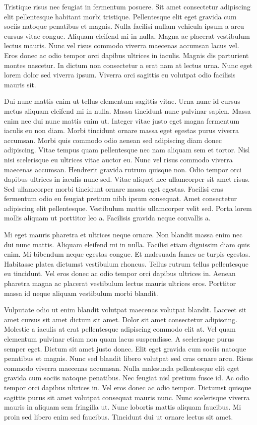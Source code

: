 \documentclass[11pt,a4paper]{article}
\begin{document}
Tristique risus nec feugiat in fermentum posuere. Sit amet consectetur adipiscing elit pellentesque habitant morbi tristique. Pellentesque elit eget gravida cum sociis natoque penatibus et magnis. Nulla facilisi nullam vehicula ipsum a arcu cursus vitae congue. Aliquam eleifend mi in nulla. Magna ac placerat vestibulum lectus mauris. Nunc vel risus commodo viverra maecenas accumsan lacus vel. Eros donec ac odio tempor orci dapibus ultrices in iaculis. Magnis dis parturient montes nascetur. In dictum non consectetur a erat nam at lectus urna. Nunc eget lorem dolor sed viverra ipsum. Viverra orci sagittis eu volutpat odio facilisis mauris sit.

Dui nunc mattis enim ut tellus elementum sagittis vitae. Urna nunc id cursus metus aliquam eleifend mi in nulla. Massa tincidunt nunc pulvinar sapien. Massa enim nec dui nunc mattis enim ut. Integer vitae justo eget magna fermentum iaculis eu non diam. Morbi tincidunt ornare massa eget egestas purus viverra accumsan. Morbi quis commodo odio aenean sed adipiscing diam donec adipiscing. Vitae tempus quam pellentesque nec nam aliquam sem et tortor. Nisl nisi scelerisque eu ultrices vitae auctor eu. Nunc vel risus commodo viverra maecenas accumsan. Hendrerit gravida rutrum quisque non. Odio tempor orci dapibus ultrices in iaculis nunc sed. Vitae aliquet nec ullamcorper sit amet risus. Sed ullamcorper morbi tincidunt ornare massa eget egestas. Facilisi cras fermentum odio eu feugiat pretium nibh ipsum consequat. Amet consectetur adipiscing elit pellentesque. Vestibulum mattis ullamcorper velit sed. Porta lorem mollis aliquam ut porttitor leo a. Facilisis gravida neque convallis a.

Mi eget mauris pharetra et ultrices neque ornare. Non blandit massa enim nec dui nunc mattis. Aliquam eleifend mi in nulla. Facilisi etiam dignissim diam quis enim. Mi bibendum neque egestas congue. Et malesuada fames ac turpis egestas. Habitasse platea dictumst vestibulum rhoncus. Tellus rutrum tellus pellentesque eu tincidunt. Vel eros donec ac odio tempor orci dapibus ultrices in. Aenean pharetra magna ac placerat vestibulum lectus mauris ultrices eros. Porttitor massa id neque aliquam vestibulum morbi blandit.

Vulputate odio ut enim blandit volutpat maecenas volutpat blandit. Laoreet sit amet cursus sit amet dictum sit amet. Dolor sit amet consectetur adipiscing. Molestie a iaculis at erat pellentesque adipiscing commodo elit at. Vel quam elementum pulvinar etiam non quam lacus suspendisse. A scelerisque purus semper eget. Dictum sit amet justo donec. Elit eget gravida cum sociis natoque penatibus et magnis. Nunc sed blandit libero volutpat sed cras ornare arcu. Risus commodo viverra maecenas accumsan. Nulla malesuada pellentesque elit eget gravida cum sociis natoque penatibus. Nec feugiat nisl pretium fusce id. Ac odio tempor orci dapibus ultrices in. Vel eros donec ac odio tempor. Dictumst quisque sagittis purus sit amet volutpat consequat mauris nunc. Nunc scelerisque viverra mauris in aliquam sem fringilla ut. Nunc lobortis mattis aliquam faucibus. Mi proin sed libero enim sed faucibus. Tincidunt dui ut ornare lectus sit amet.
\end{document}
